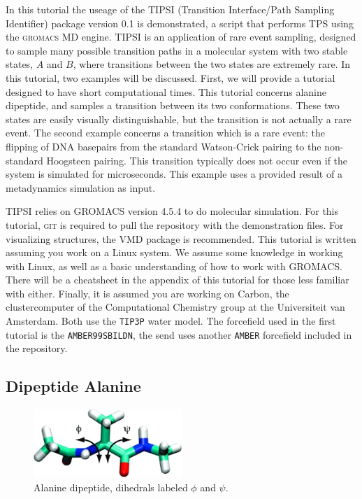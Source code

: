 \documentclass[]{article}
\begin{document}
In this tutorial the useage of the \textsc{TIPSI} (Transition Interface/Path Sampling Identifier) package version 0.1 is demonstrated, a script that performs TPS using the \textsc{gromacs} MD engine. \textsc{TIPSI} is an application of rare event sampling, designed to sample many possible transition paths in a molecular system with two stable states, $A$ and $B$, where transitions between the two states are extremely rare. In this tutorial, two examples will be discussed. First, we will provide a tutorial designed to have short computational times. This tutorial concerns alanine dipeptide, and samples a transition between its two conformations. These two states are easily visually distinguishable, but the transition is not actually a rare event. The second example concerns a transition which is a rare event: the flipping of DNA basepairs from the standard Watson-Crick pairing to the non-standard Hoogsteen pairing. This transition typically does not occur even if the system is simulated for microseconds. This example uses a provided result of a metadynamics simulation as input. 

\textsc{TIPSI} relies on \textsc{GROMACS} version 4.5.4 to do molecular simulation. For this tutorial, \textsc{git} is required to pull the repository with the demonstration files. For visualizing structures, the VMD package is recommended. This tutorial is written assuming you work on a Linux system. We assume some knowledge in working with Linux, as well as a basic understanding of how to work with \textsc{GROMACS}. There will be a cheatsheet in the appendix of this tutorial for those less familiar with either. Finally, it is assumed you are working on Carbon, the clustercomputer of the Computational Chemistry group at the Universiteit van Amsterdam.
Both use the \texttt{TIP3P} water model. The forcefield used in the first tutorial is the \texttt{AMBER99SBILDN}, the send uses another \texttt{AMBER} forcefield included in the repository.

\subsection*{Dipeptide Alanine}

\begin{figure}[ht]
    \centering
    \includegraphics[width=0.5\textwidth]{images/alanine.png}
    \caption{Alanine dipeptide, dihedrals labeled $\phi$ and $\psi$.}
    \label{fig:alanine}
\end{figure}
\end{document}
